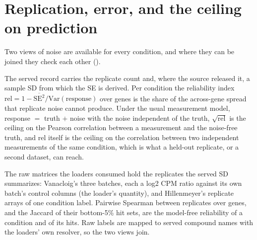 
\section{Replication, error, and the ceiling on prediction}
\label{sec:noise}

Two views of noise are available for every condition, and where they can be joined
they check each other ().

The served record carries the replicate count and, where the source released it, a
sample SD from which the SE is derived. Per condition the reliability index
$\mathrm{rel} = 1 - \overline{\mathrm{SE}^2}/\mathrm{Var}(\text{response})$ over genes
is the share of the across-gene spread that replicate noise cannot produce. Under the
usual measurement model, response $=$ truth $+$ noise with the noise independent of the
truth, $\sqrt{\mathrm{rel}}$ is the ceiling on the Pearson correlation between a
measurement and the noise-free truth, and $\mathrm{rel}$ itself is the ceiling on the
correlation between two independent measurements of the same condition, which is what a
held-out replicate, or a second dataset, can reach.

The raw matrices the loaders consumed hold the replicates the served SD summarizes:
Vanacloig's three batches, each a log2 CPM ratio against its own batch's control columns
(the loader's quantity), and Hillenmeyer's replicate arrays of one condition label.
Pairwise Spearman between replicates over genes, and the Jaccard of their bottom-5\% hit
sets, are the model-free reliability of a condition and of its hits. Raw labels are
mapped to served compound names with the loaders' own resolver, so the two views join.

\begin{table}[htbp]
\centering
\footnotesize
\caption{Replication and error per dataset. The reliability index and the ceiling on
$r$ come from the served SE; the replicate Spearman and hit Jaccard from the raw
replicates. The last row is the rank correlation between the two views over the
conditions that have both.}
\label{tab:noise}

\end{table}

